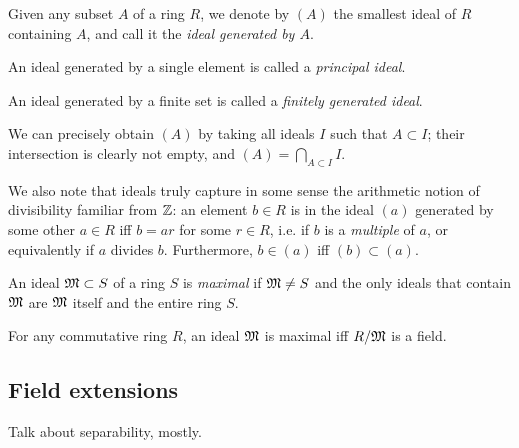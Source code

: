 \begin{defn}
	Given any subset $A$ of a ring $R$, we denote by $(A)$ the smallest ideal of $R$ containing $A$, and call it the \emph{ideal generated by $A$}.

	An ideal generated by a single element is called a \emph{principal ideal}.

	An ideal generated by a finite set is called a \emph{finitely generated ideal}.
\end{defn}

We can precisely obtain $(A)$ by taking all ideals $I$ such that $A\subset I$; their intersection is clearly not empty, and $(A)=\bigcap_{A\subset I} I$.

We also note that ideals truly capture in some sense the arithmetic notion of divisibility familiar from $\mathbb{Z}$: an element $b\in R$ is in the ideal $(a)$ generated by some other $a\in R$ iff $b=ar$ for some $r\in R$, i.e. if $b$ is a \emph{multiple} of $a$, or equivalently if $a$ divides $b$. Furthermore, $b\in(a)$ iff $(b)\subset(a)$.

\begin{defn}
	An ideal $\mathfrak{M}\subset S$ of a ring $S$ is \emph{maximal} if $\mathfrak{M}\neq S$ and the only ideals that contain $\mathfrak{M}$ are $\mathfrak{M}$ itself and the entire ring $S$.
\end{defn}

\begin{prop}[Lang II, \S 2]
	For any commutative ring $R$, an ideal $\mathfrak{M}$ is maximal iff $R/\mathfrak{M}$ is a field.
\end{prop}




\subsection{Field extensions}

Talk about separability, mostly.





